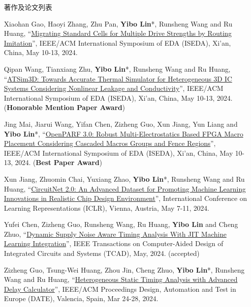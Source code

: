 \begin{rSection}{著作及论文列表}
\begin{description}[font=\normalfont, rightmargin=2em]
\item[{[C147]}]{
        Xiaohan Gao, Haoyi Zhang, Zhu Pan, \textbf{Yibo Lin}*, Runsheng Wang and Ru Huang, 
    ``\href{https://doi.org/10.1109/ISEDA62518.2024.10617650}{Migrating Standard Cells for Multiple Drive Strengths by Routing Imitation}'', 
    IEEE/ACM International Symposium of EDA (ISEDA), Xi'an, China, May 10-13, 2024.
    
}
            

\item[{[C146]}]{
        Qipan Wang, Tianxiang Zhu, \textbf{Yibo Lin}*, Runsheng Wang and Ru Huang, 
    ``\href{https://doi.org/10.1109/ISEDA62518.2024.10617604}{ATSim3D: Towards Accurate Thermal Simulator for Heterogeneous 3D IC Systems Considering Nonlinear Leakage and Conductivity}'', 
    IEEE/ACM International Symposium of EDA (ISEDA), Xi'an, China, May 10-13, 2024.
    (\textbf{Honorable Mention Paper Award})
}
            

\item[{[C145]}]{
        Jing Mai, Jiarui Wang, Yifan Chen, Zizheng Guo, Xun Jiang, Yun Liang and \textbf{Yibo Lin}*, 
    ``\href{https://doi.org/10.1109/ISEDA62518.2024.10617535}{OpenPARF 3.0: Robust Multi-Electrostatics Based FPGA Macro Placement Considering Cascaded Macros Groups and Fence Regions}'', 
    IEEE/ACM International Symposium of EDA (ISEDA), Xi'an, China, May 10-13, 2024.
    (\textbf{Best Paper Award})
}
            

\item[{[C144]}]{
        Xun Jiang, Zhuomin Chai, Yuxiang Zhao, \textbf{Yibo Lin}*, Runsheng Wang and Ru Huang, 
    ``\href{https://openreview.net/pdf?id=nMFSUjxMIl}{CircuitNet 2.0: An Advanced Dataset for Promoting Machine Learning Innovations in Realistic Chip Design Environment}'', 
    International Conference on Learning Representations (ICLR), Vienna, Austria, May 7-11, 2024.
    
}
            

\item[{[J143]}]{
        Yufei Chen, Zizheng Guo, Runsheng Wang, Ru Huang, \textbf{Yibo Lin} and Cheng Zhuo, 
    ``\href{https://doi.org/10.1109/TCAD.2023.3342603}{Dynamic Supply Noise Aware Timing Analysis With JIT Machine Learning Integration}'', 
    IEEE Transactions on Computer-Aided Design of Integrated Circuits and Systems (TCAD), May, 2024.
    (accepted)
}
            

\item[{[C142]}]{
        Zizheng Guo, Tsung-Wei Huang, Zhou Jin, Cheng Zhuo, \textbf{Yibo Lin}*, Runsheng Wang and Ru Huang, 
    ``\href{https://ieeexplore.ieee.org/document/10546507}{Heterogeneous Static Timing Analysis with Advanced Delay Calculator}'', 
    IEEE/ACM Proceedings Design, Automation and Test in Europe (DATE), Valencia, Spain, Mar 24-28, 2024.
    
}
\end{description}
\end{rSection}
